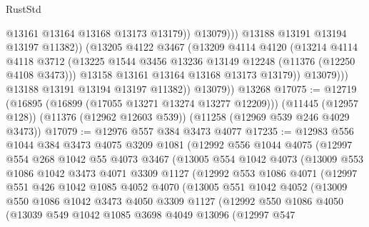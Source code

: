\begin{lexlean}{RustStd}
\begin{coremodule}
{{{{{{{{{{{{{{{{{{{                              @13161
                              @13164
                              @13168
                              @13173
                              @13179))
                          @13079)))
                    @13188
                    @13191
                    @13194
                    @13197
                    @11382))
                (@13205
                  @4122
                  @3467
                  (@13209
                    @4114
                    @4120
                    (@13214
                      @4114
                      @4118
                      @3712
                      (@13225 @1544 @3456 @13236 @13149 @12248 (@11376 (@12250 @4108 @3473)))
                      @13158
                      @13161
                      @13164
                      @13168
                      @13173
                      @13179))
                  @13079)))
            @13188
            @13191
            @13194
            @13197
            @11382))
        @13079))
    @13268
@17075 := @12719
    (@16895 (@16899 (@17055 @13271 @13274 @13277 @12209)))
    (@11445 (@12957 @128))
    (@11376 (@12962 @12603 @539))
    (@11258 (@12969 @539 @246 @4029 @3473))
@17079 := @12976 @557 @384 @3473 @4077
@17235 := @12983
    @556
    @1044
    @384
    @3473
    @4075
    @3209
    @1081
    (@12992
      @556
      @1044
      @4075
      (@12997
        @554
        @268
        @1042
        @55
        @4073
        @3467
        (@13005
          @554
          @1042
          @4073
          (@13009
            @553
            @1086
            @1042
            @3473
            @4071
            @3309
            @1127
            (@12992
              @553
              @1086
              @4071
              (@12997
                @551
                @426
                @1042
                @1085
                @4052
                @4070
                (@13005
                  @551
                  @1042
                  @4052
                  (@13009
                    @550
                    @1086
                    @1042
                    @3473
                    @4050
                    @3309
                    @1127
                    (@12992
                      @550
                      @1086
                      @4050
                      (@13039
                        @549
                        @1042
                        @1085
                        @3698
                        @4049
                        @13096
                        (@12997
                          @547
}}}}}}}}}}}}}}}}}}}
\end{coremodule}
\end{lexlean}
